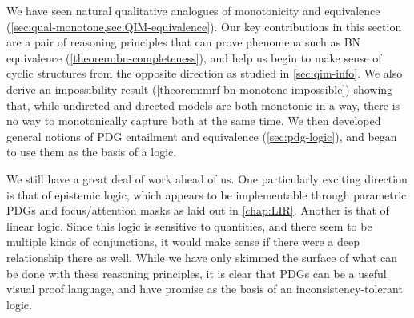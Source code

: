 We have seen natural qualitative analogues of monotonicity and equivalence (\cref{sec:qual-monotone,sec:QIM-equivalence}). 
Our key contributions in this section are a pair of reasoning principles that can prove phenomena such as BN equivalence (\cref{theorem:bn-completeness}), and help us begin to make sense of cyclic structures from the opposite direction as studied in \cref{sec:qim-info}. 
We also derive an impossibility result (\cref{theorem:mrf-bn-monotone-impossible}) showing that, while undireted and directed models are both monotonic in a way, there is no way to monotonically capture both at the same time.
We then developed general notions of PDG entailment and equivalence (\cref{sec:pdg-logic}), and began to use them as the basis of a logic.


We still have a great deal of work ahead of us. 
One particularly exciting direction is that of epistemic logic, which appears to be implementable through parametric PDGs and focus/attention masks as laid out in \cref{chap:LIR}. 
%
Another is that of linear logic. Since this logic is sensitive to quantities, and there seem to be multiple kinds of conjunctions, it would make sense if there were a deep relationship there as well.
While we have only skimmed the surface of what can be done with these reasoning principles, it is clear that PDGs can be a useful visual proof language, and have promise as the basis of an inconsistency-tolerant logic. 

